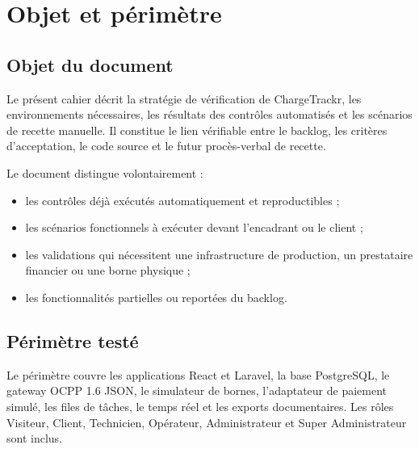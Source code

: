 \chapter{Objet et périmètre}

\section{Objet du document}

Le présent cahier décrit la stratégie de vérification de ChargeTrackr, les
environnements nécessaires, les résultats des contrôles automatisés et les
scénarios de recette manuelle. Il constitue le lien vérifiable entre le backlog,
les critères d'acceptation, le code source et le futur procès-verbal de recette.

Le document distingue volontairement :

\begin{itemize}[leftmargin=6mm]
  \item les contrôles déjà exécutés automatiquement et reproductibles ;
  \item les scénarios fonctionnels à exécuter devant l'encadrant ou le client ;
  \item les validations qui nécessitent une infrastructure de production, un
        prestataire financier ou une borne physique ;
  \item les fonctionnalités partielles ou reportées du backlog.
\end{itemize}

\section{Périmètre testé}

Le périmètre couvre les applications React et Laravel, la base PostgreSQL, le
gateway OCPP 1.6 JSON, le simulateur de bornes, l'adaptateur de paiement simulé,
les files de tâches, le temps réel et les exports documentaires. Les rôles
Visiteur, Client, Technicien, Opérateur, Administrateur et Super Administrateur
sont inclus.

